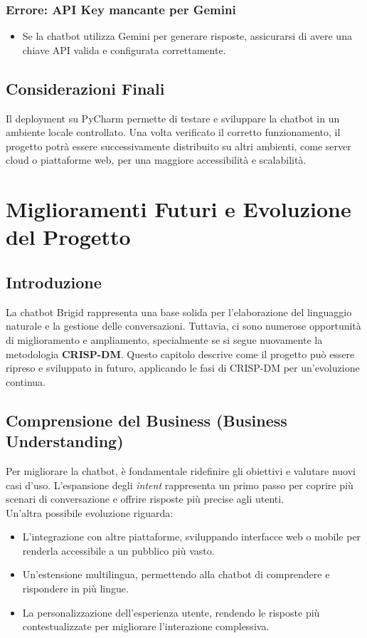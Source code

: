 \documentclass[12pt, letterpaper]{article}
\begin{document}
\subsubsection{Errore: API Key mancante per Gemini}
\begin{itemize}
	\item Se la chatbot utilizza Gemini per generare risposte, assicurarsi di avere una chiave API valida e configurata correttamente.
\end{itemize}

\subsection{Considerazioni Finali}

Il deployment su PyCharm permette di testare e sviluppare la chatbot in un ambiente locale controllato. Una volta verificato il corretto funzionamento, il progetto potrà essere successivamente distribuito su altri ambienti, come server cloud o piattaforme web, per una maggiore accessibilità e scalabilità.

\section{Miglioramenti Futuri e Evoluzione del Progetto}

\subsection{Introduzione}
La chatbot Brigid rappresenta una base solida per l'elaborazione del linguaggio naturale e la gestione delle conversazioni. Tuttavia, ci sono numerose opportunità di miglioramento e ampliamento, specialmente se si segue nuovamente la metodologia \textbf{CRISP-DM}. Questo capitolo descrive come il progetto può essere ripreso e sviluppato in futuro, applicando le fasi di CRISP-DM per un'evoluzione continua.

\subsection{Comprensione del Business (Business Understanding)}
Per migliorare la chatbot, è fondamentale ridefinire gli obiettivi e valutare nuovi casi d’uso. L’espansione degli \textit{intent} rappresenta un primo passo per coprire più scenari di conversazione e offrire risposte più precise agli utenti.\\  
Un'altra possibile evoluzione riguarda:
\begin{itemize}
	\item L'integrazione con altre piattaforme, sviluppando interfacce web o mobile per renderla accessibile a un pubblico più vasto.
	\item Un'estensione multilingua, permettendo alla chatbot di comprendere e rispondere in più lingue.
	\item La personalizzazione dell’esperienza utente, rendendo le risposte più contestualizzate per migliorare l'interazione complessiva.
\end{itemize}
\end{document}
